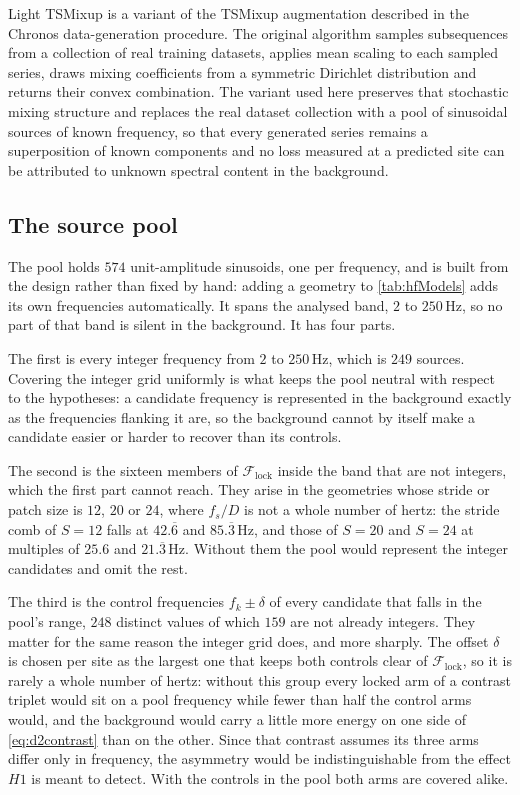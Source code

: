 

\medskip 

Light TSMixup is a variant of the TSMixup augmentation described in the Chronos data-generation procedure\autocite{ansariChronosLearningLanguage2024}. The original algorithm samples subsequences from a collection of real training datasets, applies mean scaling to each sampled series, draws mixing coefficients from a symmetric Dirichlet distribution and returns their convex combination. The variant used here preserves that stochastic mixing structure and replaces the real dataset collection with a pool of sinusoidal sources of known frequency, so that every generated series remains a superposition of known components and no loss measured at a predicted site can be attributed to unknown spectral content in the background.

\subsection{The source pool}

The pool holds $574$ unit-amplitude sinusoids, one per frequency, and is built from the design rather than fixed by hand: adding a geometry to \autoref{tab:hfModels} adds its own frequencies automatically. It spans the analysed band, $2$ to $250$\,Hz, so no part of that band is silent in the background. It has four parts.

The first is every integer frequency from $2$ to $250$\,Hz, which is $249$ sources. Covering the integer grid uniformly is what keeps the pool neutral with respect to the hypotheses: a candidate frequency is represented in the background exactly as the frequencies flanking it are, so the background cannot by itself make a candidate easier or harder to recover than its controls.

The second is the sixteen members of $\mathcal F_{\mathrm{lock}}$ inside the band that are not integers, which the first part cannot reach. They arise in the geometries whose stride or patch size is $12$, $20$ or $24$, where $f_s/D$ is not a whole number of hertz: the stride comb of $S=12$ falls at $42.\overline{6}$ and $85.\overline{3}$\,Hz, and those of $S=20$ and $S=24$ at multiples of $25.6$ and $21.\overline{3}$\,Hz. Without them the pool would represent the integer candidates and omit the rest.

The third is the control frequencies $f_k\pm\delta$ of every candidate that falls in the pool's range, $248$ distinct values of which $159$ are not already integers. They matter for the same reason the integer grid does, and more sharply. The offset $\delta$ is chosen per site as the largest one that keeps both controls clear of $\mathcal F_{\mathrm{lock}}$, so it is rarely a whole number of hertz: without this group every locked arm of a contrast triplet would sit on a pool frequency while fewer than half the control arms would, and the background would carry a little more energy on one side of \autoref{eq:d2contrast} than on the other. Since that contrast assumes its three arms differ only in frequency, the asymmetry would be indistinguishable from the effect $H1$ is meant to detect. With the controls in the pool both arms are covered alike.

